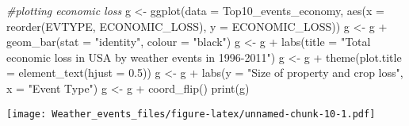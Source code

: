 \documentclass[
]{article}
\newenvironment{Shaded}{\begin{snugshade}}{\end{snugshade}}
\newcommand{\AttributeTok}[1]{\textcolor[rgb]{0.77,0.63,0.00}{#1}}
\newcommand{\CommentTok}[1]{\textcolor[rgb]{0.56,0.35,0.01}{\textit{#1}}}
\newcommand{\FloatTok}[1]{\textcolor[rgb]{0.00,0.00,0.81}{#1}}
\newcommand{\FunctionTok}[1]{\textcolor[rgb]{0.00,0.00,0.00}{#1}}
\newcommand{\NormalTok}[1]{#1}
\newcommand{\OtherTok}[1]{\textcolor[rgb]{0.56,0.35,0.01}{#1}}
\newcommand{\SpecialCharTok}[1]{\textcolor[rgb]{0.00,0.00,0.00}{#1}}
\newcommand{\StringTok}[1]{\textcolor[rgb]{0.31,0.60,0.02}{#1}}
\begin{document}
\begin{Shaded}
\begin{Highlighting}[]
\CommentTok{\#plotting economic loss}
\NormalTok{g }\OtherTok{\textless{}{-}} \FunctionTok{ggplot}\NormalTok{(}\AttributeTok{data =}\NormalTok{ Top10\_events\_economy, }\FunctionTok{aes}\NormalTok{(}\AttributeTok{x =} \FunctionTok{reorder}\NormalTok{(EVTYPE, ECONOMIC\_LOSS), }\AttributeTok{y =}\NormalTok{ ECONOMIC\_LOSS))}
\NormalTok{g }\OtherTok{\textless{}{-}}\NormalTok{ g }\SpecialCharTok{+} \FunctionTok{geom\_bar}\NormalTok{(}\AttributeTok{stat =} \StringTok{"identity"}\NormalTok{, }\AttributeTok{colour =} \StringTok{"black"}\NormalTok{)}
\NormalTok{g }\OtherTok{\textless{}{-}}\NormalTok{ g }\SpecialCharTok{+} \FunctionTok{labs}\NormalTok{(}\AttributeTok{title =} \StringTok{"Total economic loss in USA by weather events in 1996{-}2011"}\NormalTok{)}
\NormalTok{g }\OtherTok{\textless{}{-}}\NormalTok{ g }\SpecialCharTok{+} \FunctionTok{theme}\NormalTok{(}\AttributeTok{plot.title =} \FunctionTok{element\_text}\NormalTok{(}\AttributeTok{hjust =} \FloatTok{0.5}\NormalTok{))}
\NormalTok{g }\OtherTok{\textless{}{-}}\NormalTok{ g }\SpecialCharTok{+} \FunctionTok{labs}\NormalTok{(}\AttributeTok{y =} \StringTok{"Size of property and crop loss"}\NormalTok{, }\AttributeTok{x =} \StringTok{"Event Type"}\NormalTok{)}
\NormalTok{g }\OtherTok{\textless{}{-}}\NormalTok{ g }\SpecialCharTok{+} \FunctionTok{coord\_flip}\NormalTok{()}
\FunctionTok{print}\NormalTok{(g)}
\end{Highlighting}
\end{Shaded}

\texttt{[image: Weather\_events\_files/figure-latex/unnamed-chunk-10-1.pdf]}
\end{document}
